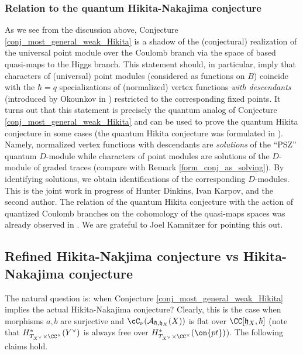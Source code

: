 \documentclass[12pt]{amsart}
\begin{document}
\subsubsection{Relation to the quantum Hikita-Nakajima conjecture} \label{quantum Dmod}
As we see from the discussion above, Conjecture \ref{conj_most_general_weak_Hikita} is a shadow of the (conjectural) realization of the universal point module over the Coulomb branch via the space of based quasi-maps to the Higgs branch. This statement should, in particular, imply that characters of (universal) point modules (considered as functions on $B$) coincide with the $\hbar=q$ specializations of (normalized) vertex functions {\em{with descendants}} (introduced by Okounkov in \cite[Section 7.2]{O}) restricted to the corresponding fixed points.
It turns out that this statement is precisely the quantum analog of Conjecture \ref{conj_most_general_weak_Hikita} and can be used to prove the quantum Hikita conjecture in some cases (the quantum Hikita conjecture was formulated in \cite{kmp}). Namely, normalized vertex functions
with descendants are {\emph{solutions}} of the ``PSZ'' quantum $D$-module while characters of point modules are solutions of the $D$-module of graded traces (compare with Remark \ref{form_conj_as_solving}). By identifying solutions, we obtain identifications of the corresponding $D$-modules.
This is the joint work in progress of Hunter Dinkins, Ivan Karpov, and the second author. The relation of the quantum Hikita conjecture with the action of quantized Coulomb branches on the cohomology of the quasi-maps spaces was already observed in \cite[Remark 1.10]{HKW}. We are grateful to Joel Kamnitzer for pointing this out.




\subsection{Refined Hikita-Nakjima conjecture vs Hikita-Nakajima conjecture}\label{weak_vs_original} The natural question is: when Conjecture \ref{conj_most_general_weak_Hikita} implies the actual Hikita-Nakajima conjecture? Clearly, this is the case when morphisms $a,b$ are surjective and $\cC_\nu(\mathcal{A}_{\hbar,\mathfrak{h}_X}(X))$ is flat over $\CC[\mathfrak{h}_{X},\hbar]$ (note that $H^*_{T_{X^\vee} \times \CC^\times}(Y^\vee)$ is always free over $H^*_{T_{X^\vee} \times \CC^\times}(\on{pt})$). 
The following claims hold.
\end{document}

